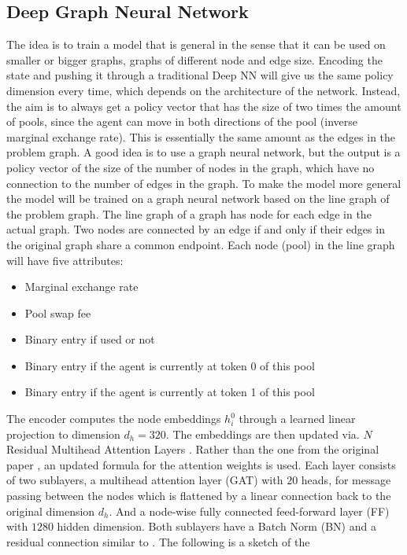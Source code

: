 \subsection{Deep Graph Neural Network}
The idea is to train a model that is general in the sense that it can be used
on smaller or bigger graphs, graphs of different node and edge size. Encoding
the state and pushing it through a traditional Deep NN will give us the same
policy dimension every time, which depends on the architecture of the
network. Instead, the aim is to always get a policy vector that has the size
of two times the amount of pools, since the agent can move in both directions
of the pool (inverse marginal exchange rate). This is essentially the same
amount as the edges in the problem graph. A good idea is to use a graph
neural network, but the output is a policy vector of the size of the number of
nodes in the graph, which have no connection to the number of edges in the
graph. To make the model more general the model will be trained on a graph
neural network based on the line graph of the problem graph. The line graph of a
graph has node for each edge in the actual graph. Two nodes are connected
by an edge if and only if their edges in the original graph share a common
endpoint. Each node (pool) in the line graph will have five attributes:
\begin{itemize}
    \item Marginal exchange rate
    \item Pool swap fee
    \item Binary entry if used or not
    \item Binary entry if the agent is currently at token 0 of this pool
    \item Binary entry if the agent is currently at token 1 of this pool
\end{itemize}
The encoder computes the node embeddings $h_i^{0}$ through a learned linear
projection to dimension $d_h = 320$. The embeddings are then updated via. $N$
Residual Multihead Attention Layers \cite{gatv2}. Rather than the one from
the original paper \cite{gan_velickovic}, an updated formula for the
attention weights is used. Each layer consists of two sublayers, a multihead
attention layer (GAT) with $20$ heads, for message passing between the nodes
which is flattened by a linear connection back to the original dimension
$d_h$. And a node-wise fully connected feed-forward layer (FF) with $1280$
hidden dimension. Both sublayers have a Batch Norm (BN) and a residual
connection similar to \cite{rl_coopt}. The following is a sketch of the
